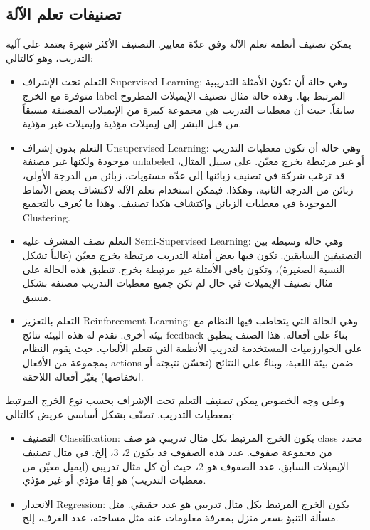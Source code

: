 \subsection{تصنيفات تعلم الآلة}
\label{sec:ml:classification}
يمكن تصنيف أنظمة تعلم الآلة وفق عدّة معايير. التصنيف الأكثر شهرة يعتمد على آلية التدريب، وهو كالتالي:
\begin{itemize}
	\item
	التعلم تحت الإشراف \textenglish{Supervised Learning}:
	وهي حالة أن تكون الأمثلة التدريبية متوفرة مع الخرج \textenglish{label} المرتبط بها. وهذه حالة مثال تصنيف الإيميلات المطروح سابقاً.
	حيث أن معطيات التدريب هي مجموعة كبيرة من الإيميلات المصنفة مسبقاً من قبل البشر إلى إيميلات مؤذية وإيميلات غير مؤذية.
	\item
	التعلم بدون إشراف \textenglish{Unsupervised Learning}:
	وهي حالة أن تكون معطيات التدريب موجودة ولكنها غير مصنفة \textenglish{unlabeled} أو غير مرتبطة بخرج معيّن.
	على سبيل المثال، قد ترغب شركة في تصنيف زبائنها إلى عدّة مستويات، زبائن من الدرجة الأولى، زبائن من الدرجة الثانية، وهكذا.
	فيمكن استخدام تعلم الآلة لاكتشاف بعض الأنماط الموجودة في معطيات الزبائن واكتشاف هكذا تصنيف.
	وهذا ما يُعرف بالتجميع \textenglish{Clustering}.
	\item
	التعلم نصف المشرف عليه \textenglish{Semi-Supervised Learning}:
	وهي حالة وسيطة بين التصنيفين السابقين. تكون فيها بعض أمثلة التدريب مرتبطة بخرج معيّن (غالباً تشكل النسبة الصغيرة)،
	وتكون باقي الأمثلة غير مرتبطة بخرج. تنطبق هذه الحالة على مثال تصنيف الإيميلات في حال لم تكن جميع معطيات التدريب مصنفة بشكل مسبق.
	\item 
	التعلم بالتعزيز \textenglish{Reinforcement Learning}:
	وهي الحالة التي يتخاطب فيها النظام مع بيئة أخرى. تقدم له هذه البيئة نتائج \textenglish{feedback} بناءً على أفعاله.
	هذا الصنف ينطبق على الخوارزميات المستخدمة لتدريب الأنظمة التي تتعلم الألعاب.
	حيث يقوم النظام بمجموعة من الأفعال \textenglish{actions} ضمن بيئة اللعبة،
	وبناءً على النتائج (تحسّن نتيجته أو انخفاضها) يغيّر أفعاله اللاحقة.
\end{itemize}

وعلى وجه الخصوص يمكن تصنيف التعلم تحت الإشراف بحسب نوع الخرج المرتبط بمعطيات التدريب.
تصنّف بشكل أساسي عريض كالتالي:
\begin{itemize}
	\item 
	التصنيف \textenglish{Classification}:
	يكون الخرج المرتبط بكل مثال تدريبي هو صف \textenglish{class} محدد من مجموعة صفوف. عدد هذه الصفوف قد يكون $2$، $3$، إلخ.
	في مثال تصنيف الإيميلات السابق، عدد الصفوف هو $2$، حيث أن كل مثال تدريبي (إيميل معيّن من معطيات التدريب) هو إمّا مؤذي أو غير مؤذي.
	\item 
	الانحدار \textenglish{Regression}:
	يكون الخرج المرتبط بكل مثال تدريبي هو عدد حقيقي. مثل مسألة التنبؤ بسعر منزل بمعرفة معلومات عنه مثل مساحته، عدد الغرف، إلخ.
\end{itemize}






